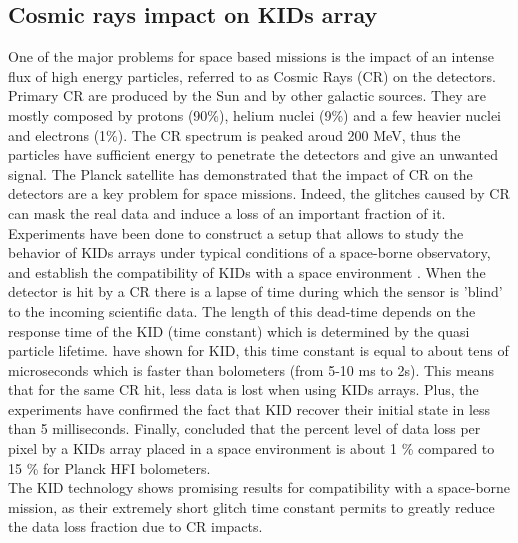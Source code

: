 \subsection{Cosmic rays impact on KIDs array}

One of the major problems for space based missions is the impact of an intense flux of high energy particles, referred to as Cosmic Rays (CR) on the detectors. Primary CR are produced by the Sun and by other galactic sources. They are mostly composed by protons (90\%), helium nuclei (9\%) and a few heavier nuclei and electrons (1\%). The CR spectrum is peaked aroud 200 MeV, thus the particles have sufficient energy to penetrate the detectors and give an unwanted signal. The Planck satellite \citep{2014A&A...571A..10P} has demonstrated that the impact of CR on the detectors are a key problem for space missions. Indeed, the glitches caused by CR can mask the real data and induce a loss of an important fraction of it.\\
Experiments have been done to construct a setup that allows to study the behavior of KIDs arrays under typical conditions of a space-borne observatory, and establish the compatibility of KIDs with a space environment \citep{2016A&A...592A..26C,2016SPIE.9914E..0NM}. When the detector is hit by a CR there is a lapse of time during which the sensor is 'blind' to the incoming scientific data. The length of this dead-time depends on the response time of the KID (time constant) which is determined by the quasi particle lifetime. \citet{2012ApPhL.100w2601M} have shown for KID, this time constant is equal to about tens of microseconds which is faster than bolometers (from 5-10 ms to 2s). This means that for the same CR hit, less data is lost when using KIDs arrays. Plus, the experiments have confirmed the fact that KID recover their initial state in less than 5 milliseconds. Finally, \citet{2016SPIE.9914E..0NM} concluded that the percent level of data loss per pixel by a KIDs array placed in a space environment is about 1 \% compared to 15 \% for Planck HFI bolometers.\\ The KID technology shows promising results for compatibility with a space-borne mission, as their extremely short glitch time constant permits to greatly reduce the data loss fraction due to CR impacts. 

